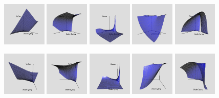 \documentclass[compress]{beamer}
\begin{document}
\begin{frame}
  \pause
  \includegraphics[width=0.82in]{figures/animation/Value04}
  \includegraphics[width=0.82in]{figures/animation/Delta04}
  \includegraphics[width=0.82in]{figures/animation/Gamma04}
  \includegraphics[width=0.82in]{figures/animation/Theta04}
  \includegraphics[width=0.82in]{figures/animation/Vega04}

  \pause
  \includegraphics[width=0.82in]{figures/animation/Value07}
  \includegraphics[width=0.82in]{figures/animation/Delta07}
  \includegraphics[width=0.82in]{figures/animation/Gamma07}
  \includegraphics[width=0.82in]{figures/animation/Theta07}
  \includegraphics[width=0.82in]{figures/animation/Vega07}

\end{frame}
\end{document}

